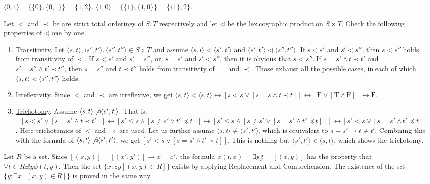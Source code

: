 \documentclass[12pt]{article}
\theoremstyle{definition}
\newenvironment{customthm}[1]
  {\renewcommand\theinnercustomthm{#1}\innercustomthm}
  {\endinnercustomthm}
\begin{document}
\begin{customthm}{I.6.17} $\langle 0,1\rangle = \{\{0\}, \{0,1\}\} = \{1,2\}$. $\langle 1,0\rangle = \{\{1\}, \{1,0\}\} = \{\{1\}, 2\}$.
\end{customthm}

\begin{customthm}{I.7.13} Let $<$ and $\prec$ be are strict total orderings of $S,T$ respectively and let $\triangleleft$ be the lexicographic product on $S\times T$. Check the following properties of $\triangleleft$ one by one.
  \begin{enumerate}
  \item\underline{Transitivity}. Let $\langle s,t\rangle, \langle s',t'\rangle, \langle s'',t''\rangle \in S\times T$ and assume $\langle s,t\rangle\triangleleft\langle s',t'\rangle$ and $\langle s',t'\rangle\triangleleft\langle s'',t''\rangle$. If $s<s'$ and $s'<s''$, then $s<s''$ holds from transitivity of $<$. If $s<s'$ and $s'=s''$, or, $s=s'$ and $s'<s''$, then it is obvious that $s<s''$.
  If $s=s'\wedge t\prec t'$ and $s'=s''\wedge t'\prec t''$, then $s=s''$ and $t\prec t''$ holds from transitivity of $=$ and $\prec$. Those exhaust all the possible cases, in each of which $\langle s,t\rangle\triangleleft\langle s'',t''\rangle$ holds.
  \item\underline{Irreflexivity}. Since $<$ and $\prec$ are irreflexive, we get $\langle s,t\rangle\triangleleft\langle s,t\rangle \leftrightarrow [s<s\vee[s=s\wedge t\prec t]] \leftrightarrow [\mathrm{F} \vee[\mathrm{T}\wedge \mathrm{F}]] \leftrightarrow \mathrm{F}$.
  \item\underline{Trichotomy}. Assume $\langle s,t\rangle\not\triangleleft\langle s',t'\rangle$. That is, $\neg[s<s'\vee[s=s'\wedge t\prec t']] \leftrightarrow [s'\leq s\wedge[s\neq s'\vee t'\preceq t]] \leftrightarrow [s'\leq s\wedge[s\neq s'\vee [s=s'\wedge t'\preceq t]]] \leftrightarrow [s'<s\vee[s=s'\wedge t'\preceq t]]$.
  Here trichotomies of $<$ and $\prec$ are used. Let us further assume $\langle s,t\rangle\neq\langle s',t'\rangle$, which is equivalent to $s=s'\rightarrow t\neq t'$. Combining this with the formula of $\langle s,t\rangle\not\triangleleft\langle s',t'\rangle$, we get $[s'<s\vee[s=s'\wedge t'\prec t]]$. This is nothing but $\langle s',t'\rangle\triangleleft\langle s,t\rangle$, which shows the trichotomy.
  \end{enumerate}
\end{customthm}

\begin{customthm}{I.7.15} Let $R$ be a set. Since  $[(x,y)]=[(x',y')]\rightarrow x=x'$, the formula $\phi(t,x)=\exists y[t=[(x, y)]$ has the property that $\forall t\in R\exists!y\phi(t,y)$. Then the set $\{x:\exists y[(x, y)\in R]\}$ exists by applying Replacement and Comprehension. The existence of the set $\{y:\exists x[(x, y)\in R]\}$ is proved in the same way.
\end{customthm}
\end{document}
